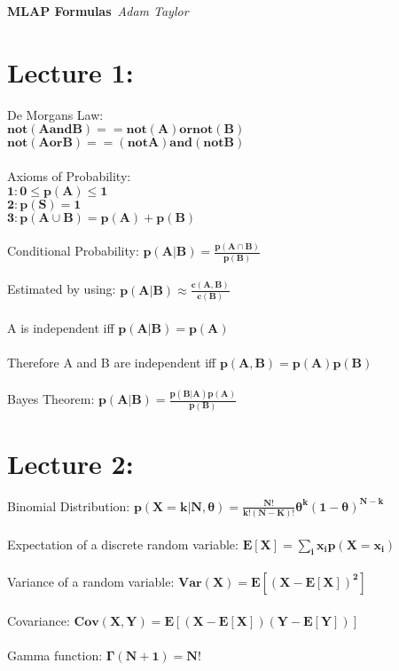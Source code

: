 \documentclass{article}
\begin{document}
\begin{center}
\Large\textbf{MLAP Formulas}\
\large\textit{Adam Taylor}
\newline
\end{center}
\section{Lecture 1:}
De Morgans Law:\\ $\mathbf{not(A and B) == not(A) or not(B)}$\\
$\mathbf{not(A or B) == (not A) and (not B)}$\\\\
Axioms of Probability:\\ $\mathbf{1: 0 \leq p(A) \leq 1}$\\
$\mathbf{2: p(S) = 1}$\\
$\mathbf{3: p(A \cup B ) = p(A) + p(B)}$\\\\
Conditional Probability: $\mathbf {p(A|B) = \frac{p(A\cap B)}{p(B)}}$\\\\
Estimated by using: $\mathbf{p(A|B) \approx \frac{c(A,B)}{c(B)}}$\\\\
A is independent iff $\mathbf{p(A|B) = p(A)}$\\\\
Therefore A and B are independent iff $\mathbf{p(A,B) = p(A)p(B)}$\\\\
Bayes Theorem: $\mathbf{p(A|B) = \frac{p(B|A)p(A)}{p(B)}}$
\section{Lecture 2:}
Binomial Distribution: $\mathbf{p(X = k|N, \theta) = \frac{N!}{k!(N-K)!}\theta^k(1-\theta)^{N-k}}$\\\\
Expectation of a discrete random variable: $\mathbf{E[X] = \sum\limits_{i}^{} x_ip(X=x_i)}$\\\\
Variance of a random variable: $\mathbf{Var(X) = E[(X-E[X])^2]}$\\\\
Covariance: $\mathbf{Cov(X,Y) = E[(X-E[X])(Y-E[Y])]}$\\\\
Gamma function: $\mathbf{\Gamma (N+1) = N!}$
\end{document}
